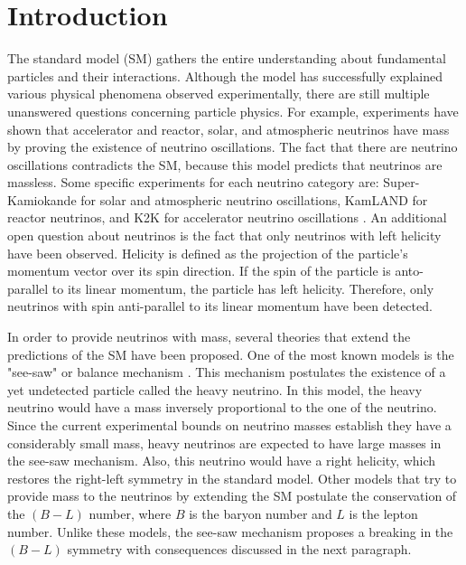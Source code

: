 \chapter{Introduction} \label{chap: Introduction}

The standard model (SM) gathers the entire understanding about fundamental particles and their interactions. Although the model has successfully explained various physical phenomena observed experimentally, there are still multiple unanswered questions concerning particle physics. For example, experiments \cite{Detectores} have shown that accelerator and reactor, solar, and atmospheric neutrinos have mass by proving the existence of neutrino oscillations. The fact that there are neutrino oscillations contradicts the SM, because this model predicts that neutrinos are massless. Some specific experiments for each neutrino category are: Super-Kamiokande \cite{Super-Kamiokande} for solar and atmospheric neutrino oscillations, KamLAND \cite{KamLAND} for reactor neutrinos, and K2K \cite{K2K} for accelerator neutrino oscillations \cite{Experimentos}. An additional open question about neutrinos is the fact that only neutrinos with left helicity have been observed. Helicity is defined as the projection of the particle's momentum vector over its spin direction. If the spin of the particle is anto-parallel to its linear momentum, the particle has left helicity. Therefore, only neutrinos with spin anti-parallel to its linear momentum have been detected.

In order to provide neutrinos with mass, several theories that extend the predictions of the SM have been proposed. One of the most known models is the "see-saw" or balance mechanism \cite{See-saw}. This mechanism postulates the existence of a yet undetected particle called the heavy neutrino. In this model, the heavy neutrino would have a mass inversely proportional to the one of the neutrino. Since the current experimental bounds on neutrino masses establish they have a considerably small mass, heavy neutrinos are expected to have large masses in the see-saw mechanism. Also, this neutrino would have a right helicity, which restores the right-left symmetry in the standard model. Other models that try to provide mass to the neutrinos by extending the SM postulate the conservation of the $(B-L)$ number, where $B$ is the baryon number and $L$ is the lepton number. Unlike these models, the see-saw mechanism proposes a breaking in the $(B-L)$ symmetry with consequences discussed in the next paragraph.

